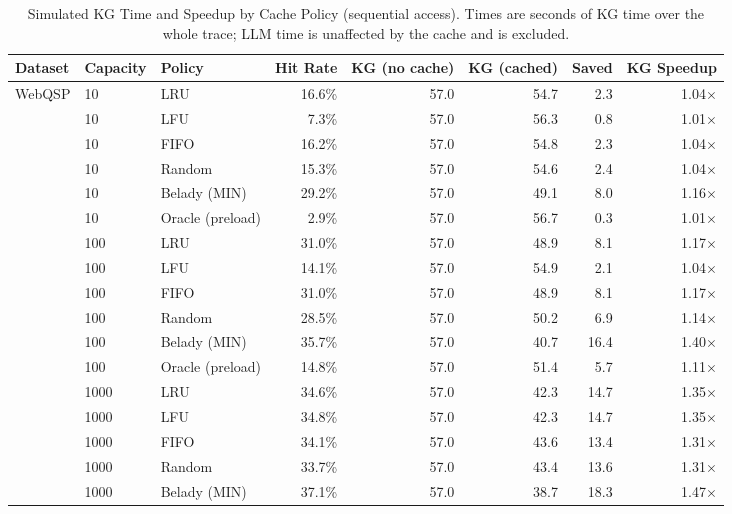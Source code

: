 \begin{table}[htbp]
\centering
\caption{Simulated KG Time and Speedup by Cache Policy (sequential access). Times are seconds of KG time over the whole trace; LLM time is unaffected by the cache and is excluded.}
\label{tab:kg_timing_sequential_sweep}
\begin{tabular}{lllrrrrr}
\hline
\textbf{Dataset} & \textbf{Capacity} & \textbf{Policy} & \textbf{Hit Rate} & \textbf{KG (no cache)} & \textbf{KG (cached)} & \textbf{Saved} & \textbf{KG Speedup} \\
\hline
WebQSP   & 10       & LRU      & 16.6\% & 57.0 & 54.7 & 2.3 & 1.04$\times$ \\
         & 10       & LFU      & 7.3\% & 57.0 & 56.3 & 0.8 & 1.01$\times$ \\
         & 10       & FIFO     & 16.2\% & 57.0 & 54.8 & 2.3 & 1.04$\times$ \\
         & 10       & Random   & 15.3\% & 57.0 & 54.6 & 2.4 & 1.04$\times$ \\
         & 10       & Belady (MIN) & 29.2\% & 57.0 & 49.1 & 8.0 & 1.16$\times$ \\
         & 10       & Oracle (preload) & 2.9\% & 57.0 & 56.7 & 0.3 & 1.01$\times$ \\
         & 100      & LRU      & 31.0\% & 57.0 & 48.9 & 8.1 & 1.17$\times$ \\
         & 100      & LFU      & 14.1\% & 57.0 & 54.9 & 2.1 & 1.04$\times$ \\
         & 100      & FIFO     & 31.0\% & 57.0 & 48.9 & 8.1 & 1.17$\times$ \\
         & 100      & Random   & 28.5\% & 57.0 & 50.2 & 6.9 & 1.14$\times$ \\
         & 100      & Belady (MIN) & 35.7\% & 57.0 & 40.7 & 16.4 & 1.40$\times$ \\
         & 100      & Oracle (preload) & 14.8\% & 57.0 & 51.4 & 5.7 & 1.11$\times$ \\
         & 1000     & LRU      & 34.6\% & 57.0 & 42.3 & 14.7 & 1.35$\times$ \\
         & 1000     & LFU      & 34.8\% & 57.0 & 42.3 & 14.7 & 1.35$\times$ \\
         & 1000     & FIFO     & 34.1\% & 57.0 & 43.6 & 13.4 & 1.31$\times$ \\
         & 1000     & Random   & 33.7\% & 57.0 & 43.4 & 13.6 & 1.31$\times$ \\
         & 1000     & Belady (MIN) & 37.1\% & 57.0 & 38.7 & 18.3 & 1.47$\times$ \\

\end{tabular}
\end{table}
